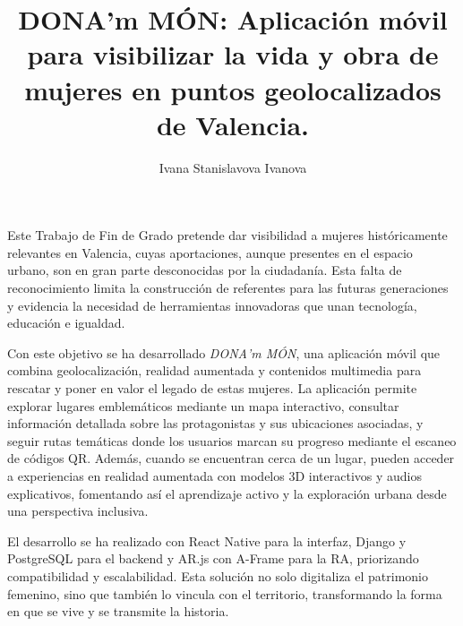 \documentclass[twoside,spanish,a4paper,12pt]{tfg}
\title{DONA'm MÓN: Aplicación móvil para visibilizar la vida y obra de mujeres en puntos geolocalizados de Valencia.}
\author{Ivana Stanislavova Ivanova}
\begin{document}
\portada
\cleardoublepage
\contraportada
\cleardoublepage
\declaracion
\cleardoublepage


\begin{resumen}
\setlength{\parskip}{8pt plus 2pt minus 1pt}
  Este Trabajo de Fin de Grado pretende dar visibilidad a mujeres históricamente relevantes en Valencia, cuyas aportaciones, aunque presentes en el espacio urbano, son en gran parte desconocidas por la ciudadanía. Esta falta de reconocimiento limita la construcción de referentes para las futuras generaciones y evidencia la necesidad de herramientas innovadoras que unan tecnología, educación e igualdad.

  Con este objetivo se ha desarrollado \textit{DONA'm MÓN}, una aplicación móvil que combina geolocalización, realidad aumentada y contenidos multimedia para rescatar y poner en valor el legado de estas mujeres. La aplicación permite explorar lugares emblemáticos mediante un mapa interactivo, consultar información detallada sobre las protagonistas y sus ubicaciones asociadas, y seguir rutas temáticas donde los usuarios marcan su progreso mediante el escaneo de códigos QR. Además, cuando se encuentran cerca de un lugar, pueden acceder a experiencias en realidad aumentada con modelos 3D interactivos y audios explicativos, fomentando así el aprendizaje activo y la exploración urbana desde una perspectiva inclusiva.

  El desarrollo se ha realizado con React Native para la interfaz, Django y PostgreSQL para el backend y AR.js con A-Frame para la RA, priorizando compatibilidad y escalabilidad. Esta solución no solo digitaliza el patrimonio femenino, sino que también lo vincula con el territorio, transformando la forma en que se vive y se transmite la historia.
\end{resumen}
\cleardoublepage
\end{document}
